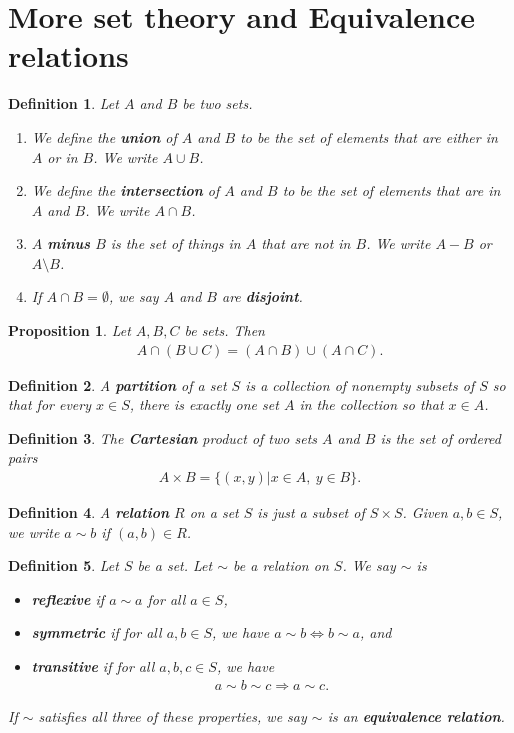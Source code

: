 \documentclass{article}
\theoremstyle{sltheorem}
\newtheorem{definition}{Definition}[section]
\newtheorem{proposition}[theorem]{Proposition}
\begin{document}
\section{More set theory and Equivalence relations}
\begin{definition}
    Let $A$ and $B$ be two sets.
    \begin{enumerate}
        \item We define the \textbf{union} of $A$ and $B$ to be the set of elements that are either in $A$ or in $B$. We write $A\cup B$.
        \item We define the \textbf{intersection} of $A$ and $B$ to be the set of elements that are in $A$ and $B$. We write $A\cap B$.
        \item $A$ \textbf{minus} $B$ is the set of things in $A$ that are not in $B$. We write $A-B$ or $A\setminus B$.
        \item If $A\cap B=\emptyset$, we say $A$ and $B$ are \textbf{disjoint}.
    \end{enumerate}
\end{definition}
\begin{proposition}
    Let $A,B,C$ be sets. Then
    \begin{align*}
        A\cap(B\cup C) = (A\cap B)\cup(A\cap C).
    \end{align*}
\end{proposition}
\begin{definition}
    A \textbf{partition} of a set $S$ is a collection of nonempty subsets of $S$ so that for every $x\in S$, there is exactly one set $A$ in the collection so that $x\in A$.
\end{definition}
\begin{definition}
    The \textbf{Cartesian} product of two sets $A$ and $B$ is the set of ordered pairs
    \begin{align*}
        A\times B = \{(x,y) | x\in A,\: y\in B\}.
    \end{align*}
\end{definition}
\begin{definition}
    A \textbf{relation} $R$ on a set $S$ is just a subset of $S\times S$. Given $a,b\in S$, we write $a\sim b$ if $(a,b)\in R$.
\end{definition}
\begin{definition}
    Let $S$ be a set. Let $\sim$ be a relation on $S$. We say $\sim$ is
    \begin{itemize}
        \item \textbf{reflexive} if $a\sim a$ for all $a\in S$,
        \item \textbf{symmetric} if for all $a,b\in S$, we have $a\sim b \Leftrightarrow b\sim a$, and
        \item \textbf{transitive} if for all $a,b,c\in S$, we have
        \begin{align*}
            a\sim b \sim c \Rightarrow a \sim c.
        \end{align*}
    \end{itemize}
    If $\sim$ satisfies all three of these properties, we say $\sim$ is an \textbf{equivalence relation}.
\end{definition}
\end{document}
